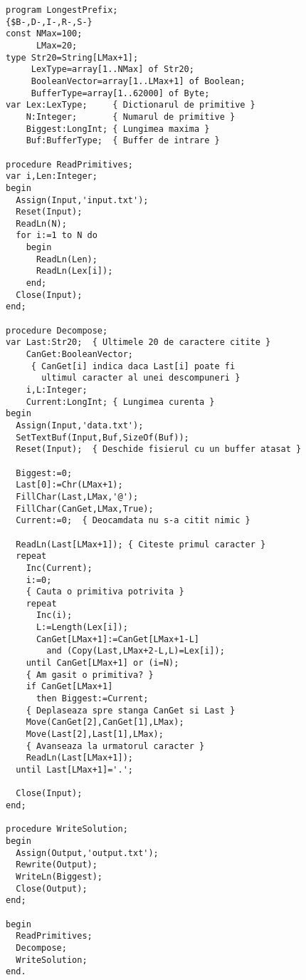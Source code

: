 \begin{verbatim}
program LongestPrefix;
{$B-,D-,I-,R-,S-}
const NMax=100;
      LMax=20;
type Str20=String[LMax+1];
     LexType=array[1..NMax] of Str20;
     BooleanVector=array[1..LMax+1] of Boolean;
     BufferType=array[1..62000] of Byte;
var Lex:LexType;     { Dictionarul de primitive }
    N:Integer;       { Numarul de primitive }
    Biggest:LongInt; { Lungimea maxima }
    Buf:BufferType;  { Buffer de intrare }

procedure ReadPrimitives;
var i,Len:Integer;
begin
  Assign(Input,'input.txt');
  Reset(Input);
  ReadLn(N);
  for i:=1 to N do
    begin
      ReadLn(Len);
      ReadLn(Lex[i]);
    end;
  Close(Input);
end;

procedure Decompose;
var Last:Str20;  { Ultimele 20 de caractere citite }
    CanGet:BooleanVector;
     { CanGet[i] indica daca Last[i] poate fi
       ultimul caracter al unei descompuneri }
    i,L:Integer;
    Current:LongInt; { Lungimea curenta }
begin
  Assign(Input,'data.txt');
  SetTextBuf(Input,Buf,SizeOf(Buf));
  Reset(Input);  { Deschide fisierul cu un buffer atasat }

  Biggest:=0;
  Last[0]:=Chr(LMax+1);
  FillChar(Last,LMax,'@');
  FillChar(CanGet,LMax,True);
  Current:=0;  { Deocamdata nu s-a citit nimic }

  ReadLn(Last[LMax+1]); { Citeste primul caracter }
  repeat
    Inc(Current);
    i:=0;
    { Cauta o primitiva potrivita }
    repeat
      Inc(i);
      L:=Length(Lex[i]);
      CanGet[LMax+1]:=CanGet[LMax+1-L]
        and (Copy(Last,LMax+2-L,L)=Lex[i]);
    until CanGet[LMax+1] or (i=N);
    { Am gasit o primitiva? }
    if CanGet[LMax+1]
      then Biggest:=Current;
    { Deplaseaza spre stanga CanGet si Last }
    Move(CanGet[2],CanGet[1],LMax);
    Move(Last[2],Last[1],LMax);
    { Avanseaza la urmatorul caracter }
    ReadLn(Last[LMax+1]);
  until Last[LMax+1]='.';

  Close(Input);
end;

procedure WriteSolution;
begin
  Assign(Output,'output.txt');
  Rewrite(Output);
  WriteLn(Biggest);
  Close(Output);
end;

begin
  ReadPrimitives;
  Decompose;
  WriteSolution;
end.
\end{verbatim}
